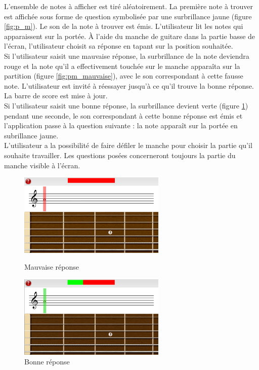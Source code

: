 \documentclass{scrreprt}
\begin{document}
\bigbreak

L'ensemble de notes à afficher est tiré aléatoirement. La première note à trouver est affichée sous forme de question symbolisée par une surbrillance jaune (figure \ref{fig:p_m}).
Le son de la note à trouver est émis.
L'utilisateur lit les notes qui apparaissent sur la portée.
À l'aide du manche de guitare dans la partie basse de l'écran, l'utilisateur choisit sa réponse en tapant sur la position souhaitée.\\

Si l'utilisateur saisit une mauvaise réponse, la surbrillance de la note deviendra rouge et la note qu'il a effectivement touchée sur le manche apparaîta sur la partition (figure \ref{fig:pm_mauvaise}), avec le son correspondant à cette fausse note. L'utilisateur est invité à réessayer jusqu'à ce qu'il trouve la bonne réponse.
La barre de score est mise à jour.\\
Si l’utilisateur saisit une bonne réponse, la surbrillance devient verte (figure \ref{fig:pm_bonne}) pendant une seconde, le son correspondant à cette bonne réponse est émis  et l’application passe à la question suivante : la note apparaît sur la portée en subrillance jaune.
\\
L'utilisateur a la possibilité de faire défiler le manche pour choisir la partie qu'il souhaite travailler. Les questions posées concerneront toujours la partie du manche visible à l'écran.
\bigbreak
\begin{figure}[!ht]
   \centering
   \begin{minipage}[t]{8cm}
      \centering
      \includegraphics[width=7cm]{images/portee_first_bad_question.png}
      \caption{Mauvaise réponse}
	\label{fig:pm_mauvaise}
   \end{minipage}
   \begin{minipage}[t]{8cm}
      \centering
      \includegraphics[width=7cm]{images/portee_first_good_question.png}
      \caption{Bonne réponse}
	\label{fig:pm_bonne}
   \end{minipage}
\end{figure}
\end{document}
